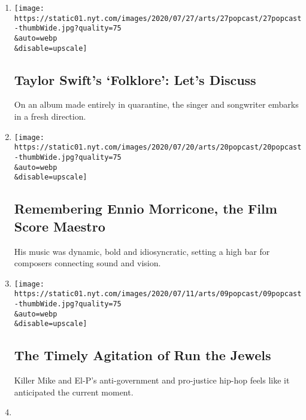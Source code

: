 \begin{enumerate}
\def\labelenumi{\arabic{enumi}.}
\item
  \href{/2020/07/27/arts/music/popcast-taylor-swift-folklore.html}{}

  \texttt{[image: https://static01.nyt.com/images/2020/07/27/arts/27popcast/27popcast-thumbWide.jpg?quality=75\\\&auto=webp\\\&disable=upscale]}

  \hypertarget{taylor-swifts-folklore-lets-discuss}{%
  \subsection{Taylor Swift's `Folklore': Let's
  Discuss}\label{taylor-swifts-folklore-lets-discuss}}

  On an album made entirely in quarantine, the singer and songwriter
  embarks in a fresh direction.
\item
  \href{/2020/07/20/arts/music/popcast-ennio-morricone.html}{}

  \texttt{[image: https://static01.nyt.com/images/2020/07/20/arts/20popcast/20popcast-thumbWide.jpg?quality=75\\\&auto=webp\\\&disable=upscale]}

  \hypertarget{remembering-ennio-morricone-the-film-score-maestro}{%
  \subsection{Remembering Ennio Morricone, the Film Score
  Maestro}\label{remembering-ennio-morricone-the-film-score-maestro}}

  His music was dynamic, bold and idiosyncratic, setting a high bar for
  composers connecting sound and vision.
\item
  \href{/2020/07/09/arts/music/popcast-run-the-jewels.html}{}

  \texttt{[image: https://static01.nyt.com/images/2020/07/11/arts/09popcast/09popcast-thumbWide.jpg?quality=75\\\&auto=webp\\\&disable=upscale]}

  \hypertarget{the-timely-agitation-of-run-the-jewels}{%
  \subsection{The Timely Agitation of Run the
  Jewels}\label{the-timely-agitation-of-run-the-jewels}}

  Killer Mike and El-P's anti-government and pro-justice hip-hop feels
  like it anticipated the current moment.
\item
  \href{/2020/06/30/arts/music/popcast-superfans-politics.html}{}


\end{enumerate}
